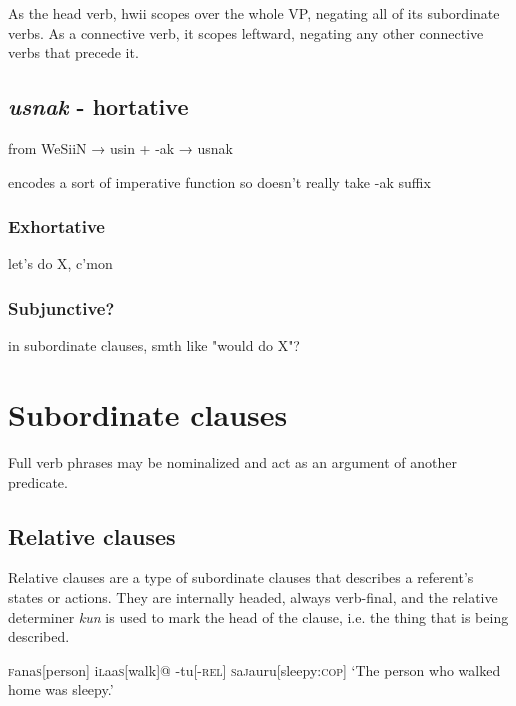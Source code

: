 \documentclass[a4paper,10pt,twoside,openright]{memoir}
\newcommand{\famwordold}[5]{#1\textsc{#2}#3\textsc{#4}#5}
\begin{document}
As the head verb, hwii scopes over the whole VP, negating all of its subordinate verbs. As a connective verb, it scopes leftward, negating any other connective verbs that precede it.

\subsection{\emph{usnak} - hortative}

from WeSiiN → usin + -ak → usnak

encodes a sort of imperative function so doesn't really take -ak suffix

\subsubsection{Exhortative}

let's do X, c'mon

\subsubsection{Subjunctive?}

in subordinate clauses, smth like "would do X"?

\subsubsection{}

\section{Subordinate clauses}

Full verb phrases may be nominalized and act as an argument of another predicate.

\subsection{Relative clauses}

Relative clauses are a type of subordinate clauses that describes a referent's states or actions. They are internally headed, always verb-final, and the relative determiner \emph{kun} is used to mark the head of the clause, i.e. the thing that is being described.

\ex
\begingl
\famwordold{}{f}{ana}{s}{}[person]
\famwordold{i}{l}{aa}{s}{}[walk]@
-tu[\textsc{-rel}]
\famwordold{}{s}{a}{j}{a}uru[sleepy:\textsc{cop}]
\glft `The person who walked home was sleepy.'
\endgl
\xe
\end{document}
